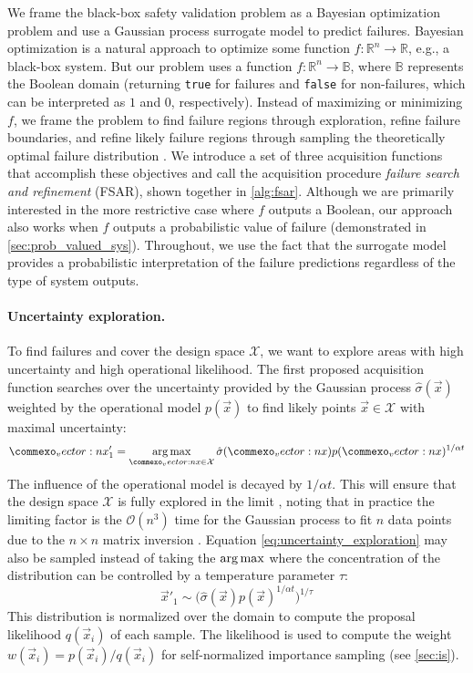 We frame the black-box safety validation problem as a Bayesian optimization problem and use a Gaussian process surrogate model to predict failures.
Bayesian optimization is a natural approach to optimize some function $f: \mathbb{R}^n \to \mathbb{R}$, e.g., a black-box system.
But our problem uses a function $f: \mathbb{R}^n \to \mathbb{B}$, where $\mathbb{B}$ represents the Boolean domain (returning \texttt{true} for failures and \texttt{false} for non-failures, which can be interpreted as $1$ and $0$, respectively).
Instead of maximizing or minimizing $f$, we frame the problem to find failure regions through exploration, refine failure boundaries, and refine likely failure regions through sampling the theoretically optimal failure distribution \cite{kahn1953methods,murphy2012machine,owen2013monte}.
We introduce a set of three acquisition functions that accomplish these objectives and call the acquisition procedure \textit{failure search and refinement} (FSAR), shown together in \cref{alg:fsar}.
Although we are primarily interested in the more restrictive case where $f$ outputs a Boolean, our approach also works when $f$ outputs a probabilistic value of failure (demonstrated in \cref{sec:prob_valued_sys}).
Throughout, we use the fact that the surrogate model provides a probabilistic interpretation of the failure predictions regardless of the type of system outputs.

\paragraph{Uncertainty exploration.} To find failures and cover the design space $\mathcal{X}$, we want to explore areas with high uncertainty and high operational likelihood. The first proposed acquisition function searches over the uncertainty provided by the Gaussian process $\hat{\sigma}(\vec{x})$ weighted by the operational model $p(\vec{x})$ to find likely points $\vec{x} \in \mathcal{X}$ with maximal uncertainty:
\begin{equation}
    \vec{x}'_1 = \argmax_{\vec{x} \in \mathcal{X}} \hat{\sigma}(\vec{x})p(\vec{x})^{1/\alpha t} \label{eq:uncertainty_exploration}
\end{equation}
The influence of the operational model is decayed by $1/\alpha t$.
This will ensure that the design space $\mathcal{X}$ is fully explored in the limit \cite{williams2006gaussian}, noting that in practice the limiting factor is the $\mathcal{O}(n^3)$ time for the Gaussian process to fit $n$ data points due to the $n \times n$ matrix inversion \cite{quinonero2005unifying}. Equation \ref{eq:uncertainty_exploration} may also be sampled instead of taking the $\argmax$ where the concentration of the distribution can be controlled by a temperature parameter $\tau$:
\begin{equation}
    \vec{x}'_1 \sim \big(\hat{\sigma}(\vec{x})p(\vec{x})^{1/\alpha t}\big)^{1/\tau} \label{eq:uncertainty_exploration_sampled}    
\end{equation}
This distribution is normalized over the domain to compute the proposal likelihood $q(\vec{x}_i)$ of each sample. The likelihood is used to compute the weight $w(\vec{x}_i) = p(\vec{x}_i) / q(\vec{x}_i)$ for self-normalized importance sampling (see \cref{sec:is}).

